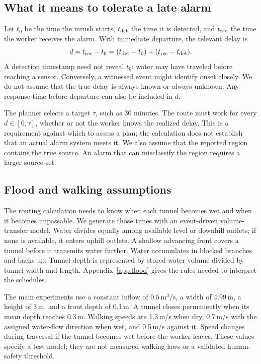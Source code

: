 \documentclass[11pt,a4paper]{article}
\begin{document}
\subsection{What it means to tolerate a late alarm}
Let $t_0$ be the time the inrush starts, $t_{\rm det}$ the time it is detected, and $t_{\rm rec}$ the time the worker receives the alarm. With immediate departure, the relevant delay is
\[
 d=t_{\rm rec}-t_0=(t_{\rm det}-t_0)+(t_{\rm rec}-t_{\rm det}).
\]
A detection timestamp need not reveal $t_0$: water may have traveled before reaching a sensor. Conversely, a witnessed event might identify onset closely. We do not assume that the true delay is always known or always unknown. Any response time before departure can also be included in $d$.

The planner selects a target $\tau$, such as 30 minutes. The route must work for every $d\in[0,\tau]$, whether or not the worker knows the realized delay. This is a requirement against which to assess a plan; the calculation does not establish that an actual alarm system meets it. We also assume that the reported region contains the true source. An alarm that can misclassify the region requires a larger source set.

\subsection{Flood and walking assumptions}\label{sec:hazard}
The routing calculation needs to know when each tunnel becomes wet and when it becomes impassable. We generate those times with an event-driven volume-transfer model. Water divides equally among available level or downhill outlets; if none is available, it enters uphill outlets. A shallow advancing front covers a tunnel before it transmits water further. Water accumulates in blocked branches and backs up. Tunnel depth is represented by stored water volume divided by tunnel width and length. Appendix~\ref{app:flood} gives the rules needed to interpret the schedules.

The main experiments use a constant inflow of $0.5\,\mathrm{m^3/s}$, a width of 4.99\,m, a height of 3\,m, and a front depth of 0.1\,m. A tunnel closes permanently when its mean depth reaches 0.3\,m. Walking speeds are 1.3\,m/s when dry, 0.7\,m/s with the assigned water-flow direction when wet, and 0.5\,m/s against it. Speed changes during traversal if the tunnel becomes wet before the worker leaves. These values specify a test model; they are not measured walking laws or a validated human-safety threshold.
\end{document}
